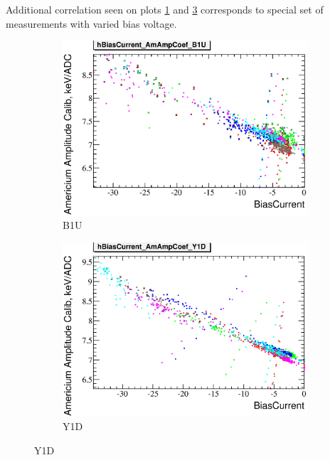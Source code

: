 \documentclass[a4paper]{article}
\begin{document}
Additional correlation seen on plots \ref{bc_vs_gain-b1u} and \ref{bc_vs_gain-y1d} corresponds to
special set of measurements with varied bias voltage.

\begin{figure}[p]
\begin{subfigure}[b]{0.5\textwidth}
\includegraphics[width=\textwidth]{gfx/run13_alpha_study/B1U/c_hBiasCurrent_AmAmpCoef.eps}
\caption{B1U}\label{bc_vs_gain-b1u}
\end{subfigure}
\begin{subfigure}[b]{0.5\textwidth}
\includegraphics[width=\textwidth]{gfx/run13_alpha_study/Y1D/c_hBiasCurrent_AmAmpCoef.eps}
\caption{Y1D}\label{bc_vs_gain-y1d}
\end{subfigure}


\end{figure}
\end{document}
